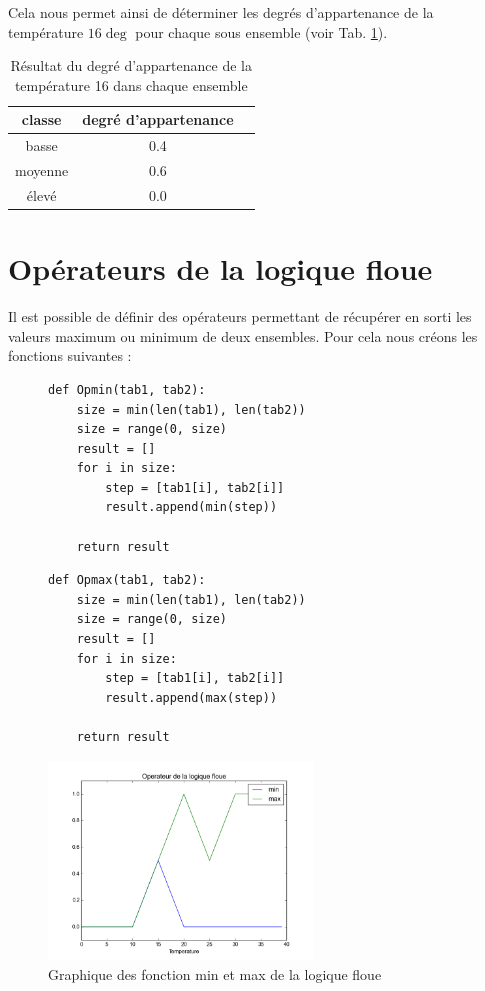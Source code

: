 \documentclass[a4paper,11pt]{article}
\begin{document}
Cela nous permet ainsi de déterminer les degrés d'appartenance de la température $16\deg$ pour chaque sous 
ensemble (voir Tab. \ref{tab:temp16}).
\begin{table}[!h]
  \label{tab:temp16}

  \begin{center}
    \begin{tabular}{|c|c|c|}
      \hline
       classe & degré d'appartenance\\
       \hline
       basse & 0.4\\
       moyenne & 0.6\\
       élevé & 0.0\\
    \end{tabular}
    \caption{Résultat du degré d'appartenance de la température 16 dans chaque ensemble}
  \end{center}
\end{table}

\section{Opérateurs de la logique floue}
Il est possible de définir des opérateurs permettant de récupérer en sorti les valeurs maximum ou 
minimum de deux ensembles. Pour cela nous créons les fonctions suivantes :
\begin{figure}[!h]
  \begin{lstlisting}[caption=Opérateur min]
   def Opmin(tab1, tab2):
    size = min(len(tab1), len(tab2))
    size = range(0, size)
    result = []
    for i in size:
        step = [tab1[i], tab2[i]]
        result.append(min(step))

    return result
  \end{lstlisting}
\end{figure}

\begin{figure}[!h]
  \begin{lstlisting}[caption=Opérateur max]
   def Opmax(tab1, tab2):
    size = min(len(tab1), len(tab2))
    size = range(0, size)
    result = []
    for i in size:
        step = [tab1[i], tab2[i]]
        result.append(max(step))

    return result
  \end{lstlisting}
\end{figure}

\begin{figure}[!h]
  \begin{center}
    \includegraphics[width=7cm]{operateurFlou.png}
    \caption{Graphique des fonction min et max de la logique floue}
    \label{fig:operateur}
  \end{center}
\end{figure}
\end{document}
